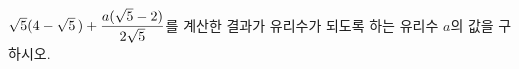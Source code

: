 $\sqrt{5}(4-\sqrt{5}\mkern3mu )+\dfrac{a(\sqrt{5}-2)}{2\sqrt{5}}$를 계산한 결과가 유리수가 되도록 하는 유리수 $a$의 값을 구하시오.
